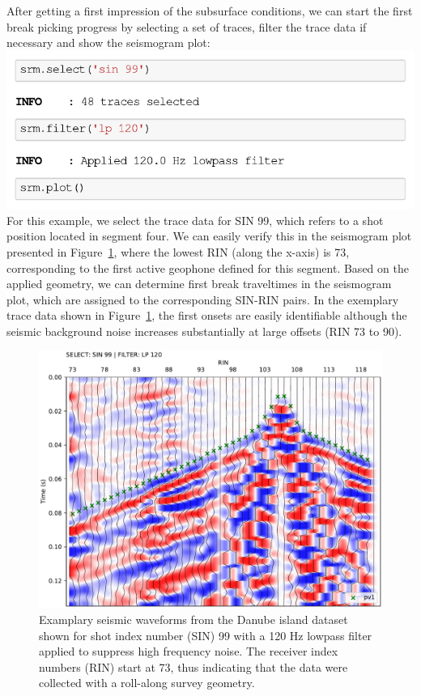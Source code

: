 \documentclass[a4paper,fleqn]{cas-sc}
\begin{document}
After getting a first impression of the subsurface conditions, we can start the first break picking progress by selecting a set of traces, filter the trace data if necessary and show the seismogram plot:
\newline
\includegraphics[width=.5\textwidth]{./figures/plotsin99_danube.pdf}
\newline
For this example, we select the trace data for SIN 99, which refers to a shot position located in segment four. We can easily verify this in the seismogram plot presented in Figure~\ref{fig:rollalong_pickwindow}, where the lowest RIN (along the x-axis) is 73, corresponding to the first active geophone defined for this segment. Based on the applied geometry, we can determine first break traveltimes in the seismogram plot, which are assigned to the corresponding SIN-RIN pairs. In the exemplary trace data shown in Figure~\ref{fig:rollalong_pickwindow}, the first onsets are easily identifiable although the seismic background noise increases substantially at large offsets (RIN 73 to 90). 
\begin{figure}
	\centering
	\includegraphics[width=.75\textwidth]{figures/danube_island_sin99_lp120_picks_vd.pdf}
	\caption{Examplary seismic waveforms from the Danube island dataset shown for shot index number (SIN) 99 with a 120 Hz lowpass filter applied to suppress high frequency noise. The receiver index numbers (RIN) start at 73, thus indicating that the data were collected with a roll-along survey geometry.}
	\label{fig:rollalong_pickwindow}
\end{figure}
\end{document}

